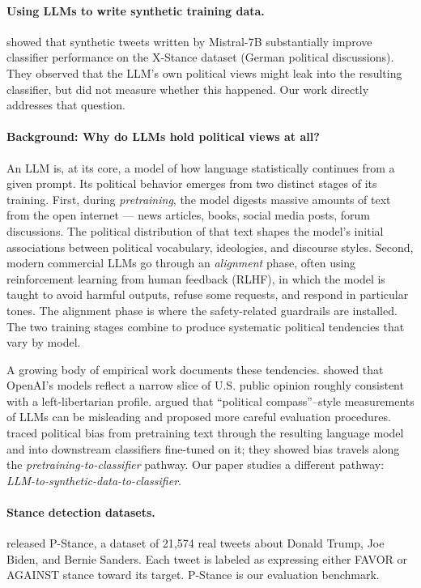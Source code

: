 \documentclass[11pt]{article}
\begin{document}
\paragraph{Using LLMs to write synthetic training data.}
\citet{wagner2024synth} showed that synthetic tweets written by Mistral-7B substantially improve classifier performance on the X-Stance dataset (German political discussions). They observed that the LLM's own political views might leak into the resulting classifier, but did not measure whether this happened. Our work directly addresses that question.

\paragraph{Background: Why do LLMs hold political views at all?}
An LLM is, at its core, a model of how language statistically continues from a given prompt. Its political behavior emerges from two distinct stages of its training. First, during \emph{pretraining}, the model digests massive amounts of text from the open internet --- news articles, books, social media posts, forum discussions. The political distribution of that text shapes the model's initial associations between political vocabulary, ideologies, and discourse styles. Second, modern commercial LLMs go through an \emph{alignment} phase, often using reinforcement learning from human feedback (RLHF), in which the model is taught to avoid harmful outputs, refuse some requests, and respond in particular tones. The alignment phase is where the safety-related guardrails are installed. The two training stages combine to produce systematic political tendencies that vary by model.

A growing body of empirical work documents these tendencies. \citet{santurkar2023whose} showed that OpenAI's models reflect a narrow slice of U.S. public opinion roughly consistent with a left-libertarian profile. \citet{rottger2024political} argued that ``political compass''--style measurements of LLMs can be misleading and proposed more careful evaluation procedures. \citet{feng2023pretraining} traced political bias from pretraining text through the resulting language model and into downstream classifiers fine-tuned on it; they showed bias travels along the \emph{pretraining-to-classifier} pathway. Our paper studies a different pathway: \emph{LLM-to-synthetic-data-to-classifier}.

\paragraph{Stance detection datasets.}
\citet{li2021pstance} released P-Stance, a dataset of 21{,}574 real tweets about Donald Trump, Joe Biden, and Bernie Sanders. Each tweet is labeled as expressing either FAVOR or AGAINST stance toward its target. P-Stance is our evaluation benchmark.
\end{document}
